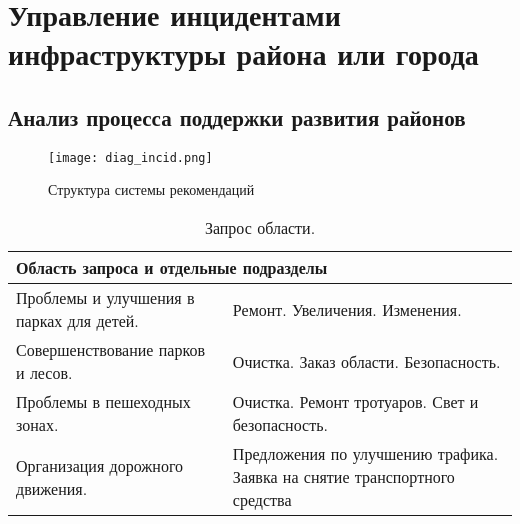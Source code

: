 \newpage
\section{Управление инцидентами инфраструктуры района или города}

\subsection{Анализ процесса поддержки развития районов}

\begin{figure}[h]
  \centering
  \texttt{[image: diag\_incid.png]}
  \caption{Структура системы рекомендаций}
  \label{image:scheme13}
\end{figure}

\begin{table}[]
\centering
\begin{tabular}{|p{4cm}|p{10cm}|}
\hline
\multicolumn{2}{|p{14cm}|}{Область запроса и отдельные подразделы} \\ \hline
Проблемы и улучшения в парках для детей.
& Ремонт.
Увеличения.
Изменения.    \\ \hline
Совершенствование парков и лесов.
& Очистка.
Заказ области.
Безопасность.   \\ \hline
Проблемы в пешеходных зонах.
&  Очистка.
Ремонт тротуаров.
Свет и безопасность.   \\ \hline
Организация дорожного движения.
& Предложения по улучшению трафика.
Заявка на снятие транспортного средства   \\ \hline

\end{tabular}
\centering
\caption{Запрос области.}
\centering
\label{tabla:sencilla3}
\end{table}